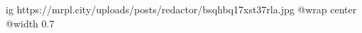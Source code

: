  
 
 
 
 

\ifcmt
  ig https://mrpl.city/uploads/posts/redactor/bsqhbq17xst37rla.jpg
  @wrap center
  @width 0.7
\fi
